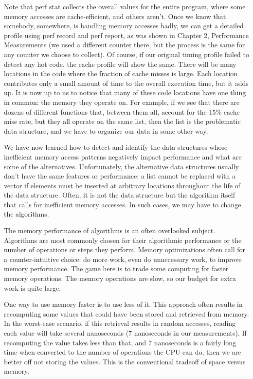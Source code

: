 Note that perf stat collects the overall values for the entire program, where some memory accesses are cache-efficient, and others aren't. Once we know that somebody, somewhere, is handling memory accesses badly, we can get a detailed profile using perf record and perf report, as was shown in Chapter 2, Performance Measurements (we used a different counter there, but the process is the same for any counter we choose to collect). Of course, if our original timing profile failed to detect any hot code, the cache profile will show the same. There will be many locations in the code where the fraction of cache misses is large. Each location contributes only a small amount of time to the overall execution time, but it adds up. It is now up to us to notice that many of these code locations have one thing in common: the memory they operate on. For example, if we see that there are dozens of different functions that, between them all, account for the 15\% cache miss rate, but they all operate on the same list, then the list is the problematic data structure, and we have to organize our data in some other way.

We have now learned how to detect and identify the data structures whose inefficient memory access patterns negatively impact performance and what are some of the alternatives. Unfortunately, the alternative data structures usually don't have the same features or performance: a list cannot be replaced with a vector if elements must be inserted at arbitrary locations throughout the life of the data structure. Often, it is not the data structure but the algorithm itself that calls for inefficient memory accesses. In such cases, we may have to change the algorithms.


The memory performance of algorithms is an often overlooked subject. Algorithms are most commonly chosen for their algorithmic performance or the number of operations or steps they perform. Memory optimizations often call for a counter-intuitive choice: do more work, even do unnecessary work, to improve memory performance. The game here is to trade some computing for faster memory operations. The memory operations are slow, so our budget for extra work is quite large.

One way to use memory faster is to use less of it. This approach often results in recomputing some values that could have been stored and retrieved from memory. In the worst-case scenario, if this retrieval results in random accesses, reading each value will take several nanoseconds (7 nanoseconds in our measurements). If recomputing the value takes less than that, and 7 nanoseconds is a fairly long time when converted to the number of operations the CPU can do, then we are better off not storing the values. This is the conventional tradeoff of space versus memory.

